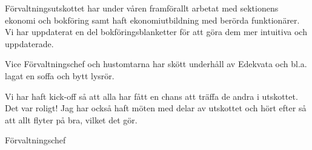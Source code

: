 \documentclass[../_main/handlingar.tex]{subfiles}
\begin{document}
Förvaltningsutskottet har under våren framförallt arbetat med sektionens ekonomi och bokföring samt haft ekonomiutbildning med berörda funktionärer. Vi har uppdaterat en del bokföringsblanketter för att göra dem mer intuitiva och uppdaterade.

Vice Förvaltningschef och hustomtarna har skött underhåll av Edekvata och bl.a. lagat en soffa och bytt lysrör.

Vi har haft kick-off så att alla har fått en chans att träffa de andra i utskottet. Det var roligt! Jag har också haft möten med delar av utskottet och hört efter så att allt flyter på bra, vilket det gör.


\begin{signatures}{1}
    \mvh
    \signature{Magnus Lundh}{Förvaltningschef}
\end{signatures}
\end{document}
